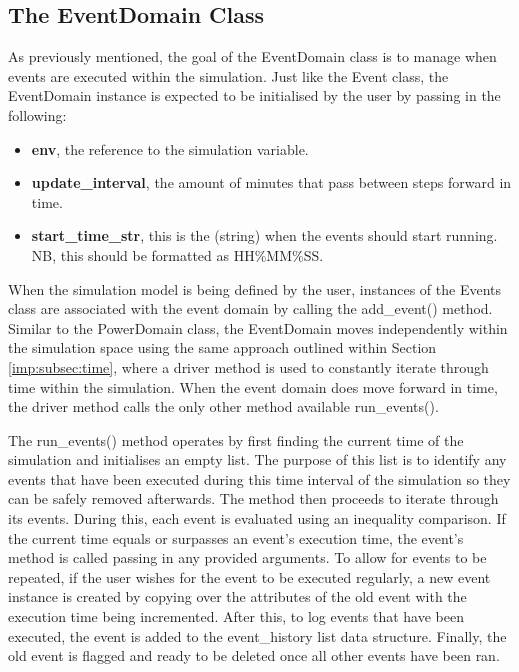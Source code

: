\documentclass{l4proj}
\begin{document}
\subsection{The EventDomain Class}\label{imp:subsec:event-domain-class}
As previously mentioned, the goal of the EventDomain class is to manage when events are executed within the simulation.
Just like the Event class, the EventDomain instance is expected to be initialised by the user by passing in the following:
\begin{itemize}
    \item \textbf{env}, the reference to the simulation variable.
    \item \textbf{update\_interval}, the amount of minutes that pass between steps forward in time.
    \item \textbf{start\_time\_str}, this is the (string) when the events should start running. NB, this should be formatted as HH\%MM\%SS.
\end{itemize}
When the simulation model is being defined by the user, instances of the Events class are associated with the event domain by calling the add\_event() method.
Similar to the PowerDomain class, the EventDomain moves independently within the simulation space using the same approach outlined within Section \ref{imp:subsec:time}, where a driver method is used to constantly iterate through time within the simulation.
When the event domain does move forward in time, the driver method calls the only other method available run\_events().

The run\_events() method operates by first finding the current time of the simulation and initialises an empty list.
The purpose of this list is to identify any events that have been executed during this time interval of the simulation so they can be safely removed afterwards.
The method then proceeds to iterate through its events.
During this, each event is evaluated using an inequality comparison.
If the current time equals or surpasses an event's execution time, the event's method is called passing in any provided arguments.
To allow for events to be repeated, if the user wishes for the event to be executed regularly, a new event instance is created by copying over the attributes of the old event with the execution time being incremented.
After this, to log events that have been executed, the event is added to the event\_history list data structure.
Finally, the old event is flagged and ready to be deleted once all other events have been ran.
\end{document}
